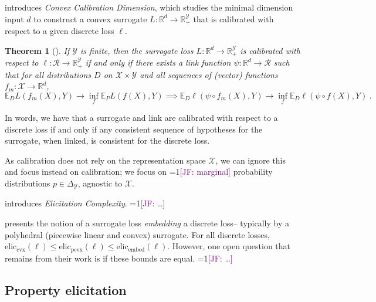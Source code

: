 \documentclass{article}
\newcommand{\Comments}{1}
\newcommand{\mynote}[2]{\ifnum\Comments=1\textcolor{#1}{#2}\fi}
\newcommand{\jessie}[1]{\mynote{purple}{[JF: #1]}}
\newcommand{\reals}{\mathbb{R}}
\newcommand{\simplex}{\Delta_\Y}
\newcommand{\eliccvx}{\mathrm{elic}_\mathrm{cvx}}
\newcommand{\elicpoly}{\mathrm{elic}_\mathrm{pcvx}}
\newcommand{\elicembed}{\mathrm{elic}_\mathrm{embed}}
\newcommand{\E}{\mathbb{E}}
\newcommand{\R}{\mathcal{R}}
\newcommand{\X}{\mathcal{X}}
\newcommand{\Y}{\mathcal{Y}}
\newtheorem{theorem}{Theorem}
\begin{document}
\cite{ramaswamy2016convex} introduces \emph{Convex Calibration Dimension}, which studies the minimal dimension input $d$ to construct a convex surrogate $L : \reals^d \to \reals^\Y_+$ that is calibrated with respect to a given discrete loss $\ell$.

\begin{theorem}[\cite{ramaswamy2016convex}]
	If $\Y$ is finite, then the surrogate loss $L:\reals^d \to \reals^\Y_+$ is calibrated with respect to $\ell: \R \to \reals^\Y_+$ if and only if there exists a link function $\psi : \reals^d \to \R$ such that for all distributions $D$ on $\X \times\Y$ and all sequences of (vector) functions $f_m : \X \to \reals^d$,
	\begin{equation*}
	\E_D L(f_m(X), Y) \to \inf_f \E_P L(f(X), Y) \implies \E_D \ell(\psi  \circ f_m(X), Y) \to \inf_f \E_D \ell(\psi \circ f(X), Y)~.~
	\end{equation*}
\end{theorem}
In words, we have that a surrogate and link are calibrated with respect to a discrete loss if and only if any consistent sequence of hypotheses for the surrogate, when linked, is consistent for the discrete loss.

As calibration does not rely on the representation space $\X$, we can ignore this and focus instead on calibration; we focus on \jessie{marginal} probability distributions $p \in \simplex$, agnostic to $\X$.

\cite{frongillo2015elicitation} introduces \emph{Elicitation Complexity}. \jessie{\ldots}

\cite{finocchiaro2019embedding} presents the notion of a surrogate loss \emph{embedding} a discrete loss-- typically by a polyhedral (piecewise linear and convex) surrogate.
For all discrete losses, $\eliccvx(\ell) \leq \elicpoly(\ell) \leq \elicembed(\ell)$.
However, one open question that remains from their work is if these bounds are equal. \jessie{\ldots}

\subsection{Property elicitation}\label{subsec:properties}
\end{document}
